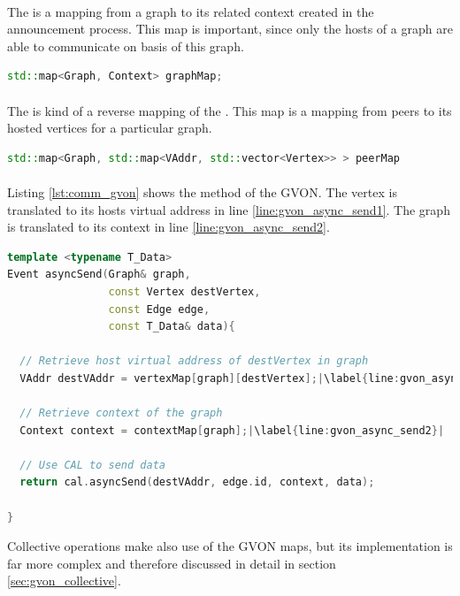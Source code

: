 \paragraph*{}
\noindent The  is a mapping from a graph to its related
context created in the announcement process.  This map is important,
since only the hosts of a graph are able to communicate on basis of
this graph.
\begin{lstlisting}[language=C++, label=lst:mapping2]
std::map<Graph, Context> graphMap;
\end{lstlisting}

\paragraph*{}
\noindent The  is kind of a reverse mapping of the
.  This map is a mapping from peers to its hosted
vertices for a particular graph.
\begin{lstlisting}[language=C++, label=lst:mapping3]
std::map<Graph, std::map<VAddr, std::vector<Vertex>> > peerMap 
\end{lstlisting}

\paragraph*{}
\noindent Listing \ref{lst:comm_gvon} shows the  method of the
GVON. The vertex is translated to its hosts virtual address in line
\ref{line:gvon_async_send1}. The graph is translated to its context
in line \ref{line:gvon_async_send2}.
\begin{lstlisting}[language=C++, label=lst:comm_gvon,escapechar=|]
template <typename T_Data>
Event asyncSend(Graph& graph, 
                const Vertex destVertex, 
                const Edge edge, 
                const T_Data& data){ 

  // Retrieve host virtual address of destVertex in graph
  VAddr destVAddr = vertexMap[graph][destVertex];|\label{line:gvon_async_send1}|

  // Retrieve context of the graph
  Context context = contextMap[graph];|\label{line:gvon_async_send2}|

  // Use CAL to send data
  return cal.asyncSend(destVAddr, edge.id, context, data);

}
\end{lstlisting}

\noindent Collective operations make also use of the GVON maps, but its
implementation is far more complex and therefore discussed in detail
in section \ref{sec:gvon_collective}.


